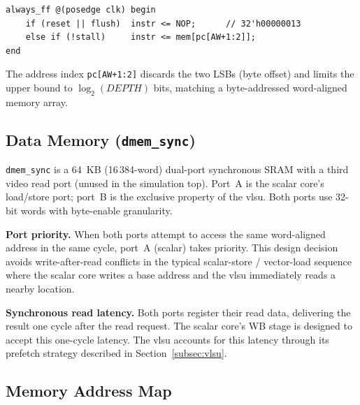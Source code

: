 \begin{lstlisting}[language=SV,
  caption={\texttt{imem\_sync}: synchronous registered output with flush and stall},
  label={lst:imem_sync}]
always_ff @(posedge clk) begin
    if (reset || flush)  instr <= NOP;      // 32'h00000013
    else if (!stall)     instr <= mem[pc[AW+1:2]];
end
\end{lstlisting}

The address index \texttt{pc[AW+1:2]} discards the two LSBs (byte offset) and limits
the upper bound to $\log_2(\mathit{DEPTH})$ bits, matching a byte-addressed word-aligned
memory array.

\subsection{Data Memory (\texttt{dmem\_sync})}
\label{subsec:dmem}

\texttt{dmem\_sync} is a 64~KB (16\,384-word) dual-port synchronous SRAM with a third
video read port (unused in the simulation top). Port~A is the scalar core's load/store
port; port~B is the exclusive property of the \gls{vlsu}. Both ports use 32-bit words
with byte-enable granularity.

\textbf{Port priority.} When both ports attempt to access the same word-aligned address
in the same cycle, port~A (scalar) takes priority. This design decision avoids
write-after-read conflicts in the typical scalar-store / vector-load sequence where the
scalar core writes a base address and the \gls{vlsu} immediately reads a nearby location.

\textbf{Synchronous read latency.} Both ports register their read data, delivering the
result one cycle after the read request. The scalar core's WB stage is designed to
accept this one-cycle latency. The \gls{vlsu} accounts for this latency through its
prefetch strategy described in Section~\ref{subsec:vlsu}.

\subsection{Memory Address Map}
\label{subsec:memmap}

